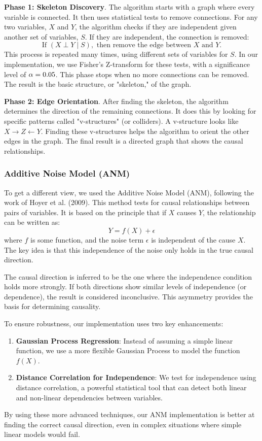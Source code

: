 \textbf{Phase 1: Skeleton Discovery}. The algorithm starts with a graph where every variable is connected. It then uses statistical tests to remove connections. For any two variables, $X$ and $Y$, the algorithm checks if they are independent given another set of variables, $S$. If they are independent, the connection is removed:
\[
\text{If } (X \perp Y \mid S), \text{ then remove the edge between } X \text{ and } Y.
\]
This process is repeated many times, using different sets of variables for $S$. In our implementation, we use Fisher's Z-transform for these tests, with a significance level of $\alpha = 0.05$. This phase stops when no more connections can be removed. The result is the basic structure, or "skeleton," of the graph.

\textbf{Phase 2: Edge Orientation}. After finding the skeleton, the algorithm determines the direction of the remaining connections. It does this by looking for specific patterns called "v-structures" (or colliders). A v-structure looks like $X \rightarrow Z \leftarrow Y$. Finding these v-structures helps the algorithm to orient the other edges in the graph. The final result is a directed graph that shows the causal relationships.

\subsubsection{Additive Noise Model (ANM)}
To get a different view, we used the Additive Noise Model (ANM), following the work of Hoyer et al. (2009)\cite{Hoyer09}. This method tests for causal relationships between pairs of variables. It is based on the principle that if $X$ causes $Y$, the relationship can be written as:
$$Y = f(X) + \epsilon$$
where $f$ is some function, and the noise term $\epsilon$ is independent of the cause $X$. The key idea is that this independence of the noise only holds in the true causal direction.

The causal direction is inferred to be the one where the independence condition holds more strongly. If both directions show similar levels of independence (or dependence), the result is considered inconclusive. This asymmetry provides the basis for determining causality.

To ensure robustness, our implementation uses two key enhancements:
\begin{enumerate}
    \item \textbf{Gaussian Process Regression}: Instead of assuming a simple linear function, we use a more flexible Gaussian Process to model the function $f(X)$.
    \item \textbf{Distance Correlation for Independence}: We test for independence using distance correlation, a powerful statistical tool that can detect both linear and non-linear dependencies between variables.
\end{enumerate}
By using these more advanced techniques, our ANM implementation is better at finding the correct causal direction, even in complex situations where simple linear models would fail.


